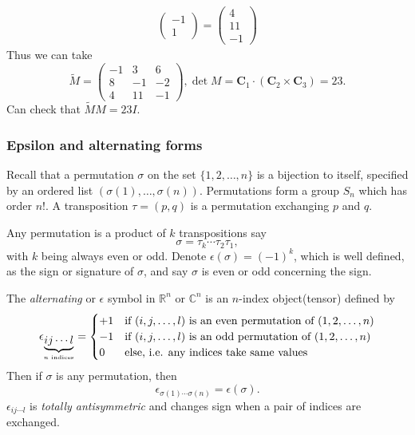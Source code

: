 \documentclass[a4paper]{article}
\begin{document}
\begin{example}
\[\begin{aligned}
\begin{pmatrix}
            -1 \\
            1
          \end{pmatrix}=
          \begin{pmatrix}
            4 \\
            11\\
            -1
          \end{pmatrix}
        \end{aligned}
      \]
      Thus we can take
      \[
        \tilde{M}=
        \begin{pmatrix}
          -1&3&6\\
          8&-1&-2\\
          4&11&-1
        \end{pmatrix}, \det M = \mathbf{C}_1 \cdot (\mathbf{C}_2
        \times \mathbf{C}_3 )=23
      .\]
      Can check that $ \tilde{M}M=23I $.
    \end{example}
    \subsubsection{Epsilon and alternating forms}
    Recall that a permutation $ \sigma $ on the set $\{1,2,\dots,n\}$
    is a bijection to itself, specified by an ordered list $
    (\sigma(1),\dots,\sigma(n)) $. Permutations form a group $ S_n $
    which has order $ n! $. A transposition $ \tau=(p,q) $ is a
    permutation exchanging $p$ and $q$.

    Any permutation is a product of $k$ transpositions say
    \[
      \sigma=\tau_k \cdots \tau_2 \tau_1
    ,\]
    with $k$ being always even or odd. Denote $
    \epsilon(\sigma)=(-1)^k $, which is well defined, as the sign or
    signature of $ \sigma $, and say $ \sigma $ is even or odd
    concerning the sign.

    The \textit{alternating} or $ \epsilon $ symbol in $
    \mathbb{R}^{n} $ or $ \mathbb{C}^{n} $ is an $n$-index
    object(tensor) defined by
    \[
      \epsilon_{\underbrace{ij\cdots l}_{n\text{ indices}}}=
      \begin{cases}
        +1 &\text{if $ (i,j,\dots,l) $ is an even permutation of $
        (1,2,\dots,n) $}\\
        -1 &\text{if $ (i,j,\dots,l) $ is an odd permutation of $
        (1,2,\dots,n) $}\\
        0 &\text{else, i.e. any indices take same values}
      \end{cases}
    \]
    Then if $ \sigma $ is any permutation, then
    \[
      \epsilon_{\sigma(1)\cdots \sigma(n)}=\epsilon(\sigma)
    .\]
    $ \epsilon_{ij\cdots l} $ is \textit{totally antisymmetric} and
    changes sign when a pair of indices are exchanged.
\end{document}

